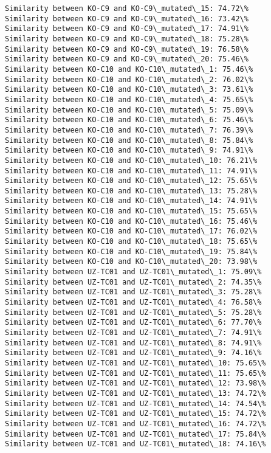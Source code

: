 \documentclass[11pt]{article}
\begin{document}
\begin{Verbatim}[commandchars=\\\{\}]
Similarity between KO-C9 and KO-C9\_mutated\_15: 74.72\%
Similarity between KO-C9 and KO-C9\_mutated\_16: 73.42\%
Similarity between KO-C9 and KO-C9\_mutated\_17: 74.91\%
Similarity between KO-C9 and KO-C9\_mutated\_18: 75.28\%
Similarity between KO-C9 and KO-C9\_mutated\_19: 76.58\%
Similarity between KO-C9 and KO-C9\_mutated\_20: 75.46\%
Similarity between KO-C10 and KO-C10\_mutated\_1: 75.46\%
Similarity between KO-C10 and KO-C10\_mutated\_2: 76.02\%
Similarity between KO-C10 and KO-C10\_mutated\_3: 73.61\%
Similarity between KO-C10 and KO-C10\_mutated\_4: 75.65\%
Similarity between KO-C10 and KO-C10\_mutated\_5: 75.09\%
Similarity between KO-C10 and KO-C10\_mutated\_6: 75.46\%
Similarity between KO-C10 and KO-C10\_mutated\_7: 76.39\%
Similarity between KO-C10 and KO-C10\_mutated\_8: 75.84\%
Similarity between KO-C10 and KO-C10\_mutated\_9: 74.91\%
Similarity between KO-C10 and KO-C10\_mutated\_10: 76.21\%
Similarity between KO-C10 and KO-C10\_mutated\_11: 74.91\%
Similarity between KO-C10 and KO-C10\_mutated\_12: 75.65\%
Similarity between KO-C10 and KO-C10\_mutated\_13: 75.28\%
Similarity between KO-C10 and KO-C10\_mutated\_14: 74.91\%
Similarity between KO-C10 and KO-C10\_mutated\_15: 75.65\%
Similarity between KO-C10 and KO-C10\_mutated\_16: 75.46\%
Similarity between KO-C10 and KO-C10\_mutated\_17: 76.02\%
Similarity between KO-C10 and KO-C10\_mutated\_18: 75.65\%
Similarity between KO-C10 and KO-C10\_mutated\_19: 75.84\%
Similarity between KO-C10 and KO-C10\_mutated\_20: 73.98\%
Similarity between UZ-TC01 and UZ-TC01\_mutated\_1: 75.09\%
Similarity between UZ-TC01 and UZ-TC01\_mutated\_2: 74.35\%
Similarity between UZ-TC01 and UZ-TC01\_mutated\_3: 75.28\%
Similarity between UZ-TC01 and UZ-TC01\_mutated\_4: 76.58\%
Similarity between UZ-TC01 and UZ-TC01\_mutated\_5: 75.28\%
Similarity between UZ-TC01 and UZ-TC01\_mutated\_6: 77.70\%
Similarity between UZ-TC01 and UZ-TC01\_mutated\_7: 74.91\%
Similarity between UZ-TC01 and UZ-TC01\_mutated\_8: 74.91\%
Similarity between UZ-TC01 and UZ-TC01\_mutated\_9: 74.16\%
Similarity between UZ-TC01 and UZ-TC01\_mutated\_10: 75.65\%
Similarity between UZ-TC01 and UZ-TC01\_mutated\_11: 75.65\%
Similarity between UZ-TC01 and UZ-TC01\_mutated\_12: 73.98\%
Similarity between UZ-TC01 and UZ-TC01\_mutated\_13: 74.72\%
Similarity between UZ-TC01 and UZ-TC01\_mutated\_14: 74.54\%
Similarity between UZ-TC01 and UZ-TC01\_mutated\_15: 74.72\%
Similarity between UZ-TC01 and UZ-TC01\_mutated\_16: 74.72\%
Similarity between UZ-TC01 and UZ-TC01\_mutated\_17: 75.84\%
Similarity between UZ-TC01 and UZ-TC01\_mutated\_18: 74.16\%

\end{Verbatim}
\end{document}
